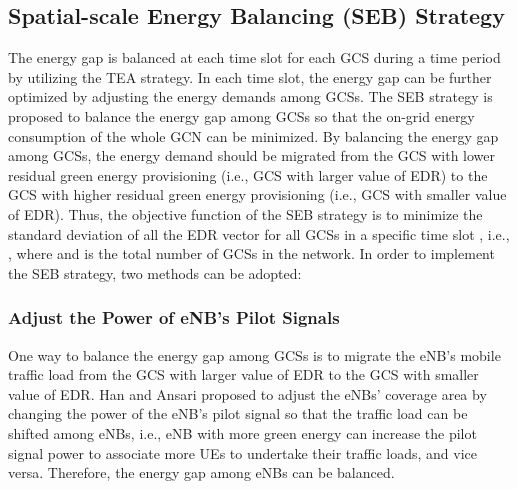 \documentclass[journal,12pt,draftclsnofoot,onecolumn]{IEEEtran}
\begin{document}
\subsection{Spatial-scale Energy Balancing (SEB) Strategy}
The energy gap is balanced at each time slot for each GCS during a time period  by utilizing the TEA strategy. In each time slot, the energy gap can be further optimized by adjusting the energy demands among GCSs. The SEB strategy is proposed to balance the energy gap among GCSs so that the on-grid energy consumption of the whole GCN can be minimized. By balancing the energy gap among GCSs, the energy demand should be migrated from the GCS with lower residual green energy provisioning (i.e., GCS with larger value of EDR) to the GCS with higher residual green energy provisioning (i.e., GCS with smaller value of EDR). Thus, the objective function of the SEB strategy is to minimize the standard deviation of all the EDR vector for all GCSs in a specific time slot , i.e., , where  and  is the total number of GCSs in the network. In order to implement the SEB strategy, two methods can be adopted: 

\subsubsection{Adjust the Power of eNB's Pilot Signals}
One way to balance the energy gap among GCSs is to migrate the eNB's mobile traffic load from the GCS with larger value of EDR to the GCS with smaller value of EDR. Han and Ansari \cite{11,13} proposed to adjust the eNBs' coverage area by changing the power of the eNB's pilot signal so that the traffic load can be shifted among eNBs, i.e., eNB with more green energy can increase the pilot signal power to associate more UEs to undertake their traffic loads, and vice versa. Therefore, the energy gap among eNBs can be balanced.
\end{document}
